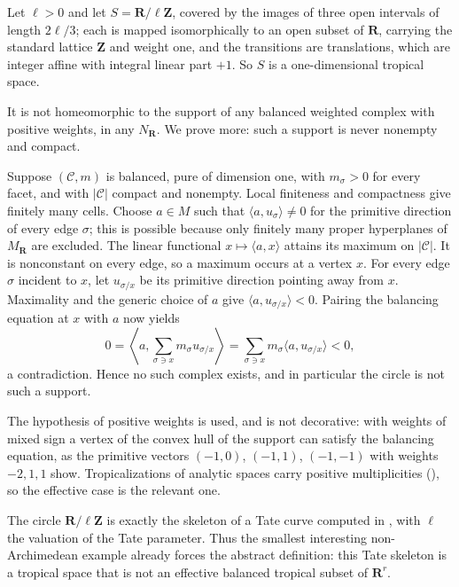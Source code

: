 \begin{example}
\label{ex:ch10-circle}
Let $\ell>0$ and let $S=\mathbf R/\ell\mathbf Z$, covered by the images of
three open intervals of length $2\ell/3$; each is mapped isomorphically to an
open subset of $\mathbf R$, carrying the standard lattice $\mathbf Z$ and
weight one, and the transitions are translations, which are integer affine
with integral linear part $+1$.  So $S$ is a one-dimensional tropical space.

It is not homeomorphic to the support of any balanced weighted complex with
positive weights, in any $N_{\mathbf R}$.  We prove more: such a support is
never nonempty and compact.

Suppose $(\mathscr C,m)$ is balanced, pure of dimension one, with $m_\sigma>0$
for every facet, and with $|\mathscr C|$ compact and nonempty.  Local
finiteness and compactness give finitely many cells.  Choose $a\in M$ such
that $\langle a,u_\sigma\rangle\neq0$ for the primitive direction of every
edge $\sigma$; this is possible because only finitely many proper hyperplanes
of $M_{\mathbf R}$ are excluded.  The linear functional
$x\mapsto\langle a,x\rangle$ attains its maximum on $|\mathscr C|$.  It is
nonconstant on every edge, so a maximum occurs at a vertex $x$.  For every
edge $\sigma$ incident to $x$, let $u_{\sigma/x}$ be its primitive direction
pointing away from $x$.  Maximality and the generic choice of $a$ give
$\langle a,u_{\sigma/x}\rangle<0$.  Pairing the balancing equation at $x$
with $a$ now yields
\[
 0=\left\langle a,
      \sum_{\sigma\ni x}m_\sigma u_{\sigma/x}\right\rangle
  =\sum_{\sigma\ni x}m_\sigma
     \langle a,u_{\sigma/x}\rangle<0,
\]
a contradiction.  Hence no such complex exists, and in particular the
circle is not such a support.

The hypothesis of positive weights is used, and is not decorative: with
weights of mixed sign a vertex of the convex hull of the support can satisfy
the balancing equation, as the primitive vectors $(-1,0)$, $(-1,1)$,
$(-1,-1)$ with weights $-2,1,1$ show.  Tropicalizations of analytic spaces
carry positive multiplicities
(), so the effective case is the
relevant one.

The circle $\mathbf R/\ell\mathbf Z$ is exactly the skeleton of a Tate curve
computed in , with $\ell$ the valuation of the Tate
parameter.  Thus the smallest interesting non-Archimedean example already
forces the abstract definition: this Tate skeleton is a tropical space
that is not an effective balanced tropical subset of $\mathbf R^r$.
\end{example}

